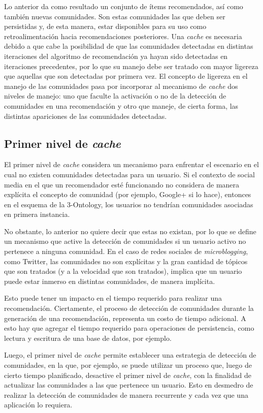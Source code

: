 Lo anterior da como resultado un conjunto de ítems recomendados, así como también nuevas comunidades. Son estas comunidades las que deben ser persistidas y, de esta manera, estar disponibles para su uso como retroalimentación hacia recomendaciones posteriores. Una \textit{cache} es necesaria debido a que cabe la posibilidad de que las comunidades detectadas en distintas iteraciones del algoritmo de recomendación ya hayan sido detectadas en iteraciones precedentes, por lo que su manejo debe ser tratado con mayor ligereza que aquellas que son detectadas por primera vez. El concepto de ligereza en el manejo de las comunidades pasa por incorporar al mecanismo de \textit{cache} dos niveles de manejo: uno que faculte la activación o no de la detección de comunidades en una recomendación y otro que maneje, de cierta forma, las distintas apariciones de las comunidades detectadas.

\subsection{Primer nivel de \textit{cache}}

El primer nivel de \textit{cache} considera un mecanismo para enfrentar el escenario en el cual no existen comunidades detectadas para un usuario. Si el contexto de social media en el que un recomendador esté funcionando no considera de manera explícita el concepto de comunidad (por ejemplo, Google+ si lo hace), entonces en el esquema de la 3-Ontology, los usuarios no tendrían comunidades asociadas en primera instancia.

No obstante, lo anterior no quiere decir que estas no existan, por lo que se define un mecanismo que active la detección de comunidades si un usuario activo no pertenece a ninguna comunidad. En el caso de redes sociales de \textit{microblogging}, como Twitter, las comunidades no son explícitas y la gran cantidad de tópicos que son tratados (y a la velocidad que son tratados), implica que un usuario puede estar inmerso en distintas comunidades, de manera implícita.

Esto puede tener un impacto en el tiempo requerido para realizar una recomendación. Ciertamente, el proceso de detección de comunidades durante la generación de una recomendación, representa un costo de tiempo adicional. A esto hay que agregar el tiempo requerido para operaciones de persistencia, como lectura y escritura de una base de datos, por ejemplo.

Luego, el primer nivel de \textit{cache} permite establecer una estrategia de detección de comunidades, en la que, por ejemplo, se puede utilizar un proceso que, luego de cierto tiempo planificado, desactive el primer nivel de \textit{cache}, con la finalidad de actualizar las comunidades a las que pertenece un usuario. Esto en desmedro de realizar la detección de comunidades de manera recurrente y cada vez que una aplicación lo requiera.

